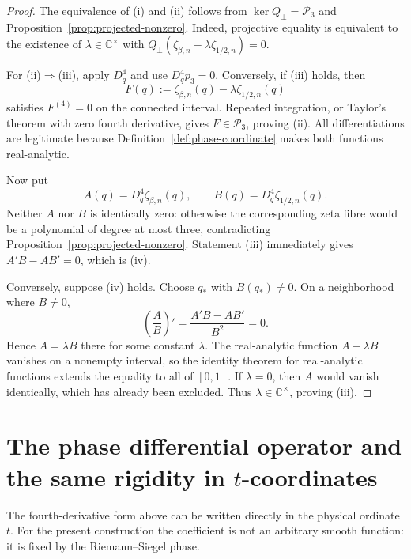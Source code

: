\documentclass[11pt]{amsart}
\numberwithin{equation}{section}
\newcommand{\C}{\mathbb C}
\newcommand{\Pcal}{\mathcal P}
\newcommand{\Dq}{D_q}
\begin{document}
\begin{proof}
The equivalence of (i) and (ii) follows from
$\ker Q_\perp=\Pcal_3$ and Proposition~\ref{prop:projected-nonzero}.  Indeed,
projective equality is equivalent to the existence of
$\lambda\in\C^\times$ with
$Q_\perp(\zeta_{\beta,n}-\lambda\zeta_{1/2,n})=0$.

For (ii)$\Rightarrow$(iii), apply $\Dq^4$ and use
$\Dq^4p_3=0$.  Conversely, if (iii) holds, then
\begin{equation}
 F(q):=\zeta_{\beta,n}(q)-\lambda\zeta_{1/2,n}(q)
 \label{eq:F-fourth-kernel}
\end{equation}
satisfies $F^{(4)}=0$ on the connected interval.  Repeated integration, or
Taylor's theorem with zero fourth derivative, gives
$F\in\Pcal_3$, proving (ii).  All differentiations are legitimate because
Definition~\ref{def:phase-coordinate} makes both functions real-analytic.

Now put
\begin{equation}
 A(q)=\Dq^4\zeta_{\beta,n}(q),
 \qquad
 B(q)=\Dq^4\zeta_{1/2,n}(q).
 \label{eq:A-B-fourth}
\end{equation}
Neither $A$ nor $B$ is identically zero: otherwise the corresponding zeta
fibre would be a polynomial of degree at most three, contradicting
Proposition~\ref{prop:projected-nonzero}.  Statement (iii) immediately gives
$A'B-AB'=0$, which is (iv).

Conversely, suppose (iv) holds.  Choose $q_*$ with $B(q_*)\neq0$.  On a
neighborhood where $B\neq0$,
\begin{equation}
 \left(\frac{A}{B}\right)'
 =\frac{A'B-AB'}{B^2}=0.
 \label{eq:ratio-derivative-zero}
\end{equation}
Hence $A=\lambda B$ there for some constant $\lambda$.  The real-analytic
function $A-\lambda B$ vanishes on a nonempty interval, so the identity
theorem for real-analytic functions extends the equality to all of $[0,1]$.
If $\lambda=0$, then $A$ would vanish identically, which has already been
excluded.  Thus $\lambda\in\C^\times$, proving (iii).
\end{proof}

\section{The phase differential operator and the same rigidity in \texorpdfstring{$t$}{t}-coordinates}
\label{sec:phase-differential-operator}

The fourth-derivative form above can be written directly in the physical
ordinate $t$.  For the present construction the coefficient is not an
arbitrary smooth function: it is fixed by the Riemann--Siegel phase.
\end{document}
